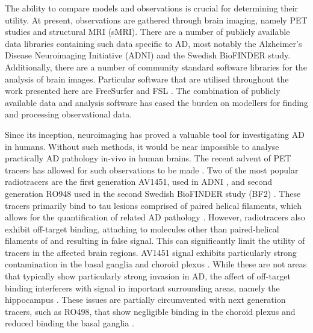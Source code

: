 The ability to compare models and observations is crucial for determining their
utility. At present, observations are gathered through brain imaging,
namely PET studies and structural MRI (sMRI). There are a number of
publicly available data libraries containing such data specific to AD, most
notably the Alzheimer's Disease Neuroimaging Initiative (ADNI) and the Swedish
BioFINDER study. Additionally, there are a number of community standard software
libraries for the analysis of brain images. Particular software that are
utilised throughout the work presented here are FreeSurfer
\cite{fischl2012freesurfer} and FSL \cite{jenkinson2012fsl}. The combination of
publicly available data and analysis software has eased the burden on modellers
for finding and processing observational data.  

Since its inception, neuroimaging has proved a valuable tool for investigating
AD in humans. Without such methods, it would be near impossible to analyse
practically AD pathology in-vivo in human brains. The recent advent of \TP PET
tracers has allowed for such observations to be made
\cite{schwarz2016regional,xia201318f, marquie2015validating,
honer2018preclinical}. Two of the most popular radiotracers are the first
generation AV1451, used in ADNI \cite{landau2016flortaucipir}, and second
generation RO948 used in the second Swedish BioFINDER study (BF2)
\cite{ossenkoppele2021accuracy}. These tracers primarily bind to tau lesions
comprised of paired helical filaments, which allows for the quantification of
\TP related AD pathology \cite{smith2020head}. However, radiotracers also
exhibit off-target binding, attaching to molecules other than paired-helical
filaments of \TP and resulting in false signal. This can significantly limit the
utility of tracers in the affected brain regions. AV1451 signal exhibits
particularly strong contamination in the basal ganglia and choroid plexus
\cite{lowe2016autoradiographic,lemoine2018,choi2018off}. While these are not
areas that typically show particularly strong invasion in AD, the affect of
off-target binding interferers with signal in important surrounding areas,
namely the hippocampus \cite{johnson2016tau, lowe2016autoradiographic}. These
issues are partially circumvented with next generation tracers, such as RO498,
that show negligible binding in the choroid plexus and reduced binding the basal
ganglia \cite{smith2020head, kuwabara2018evaluation, wong2018characterization}. 

